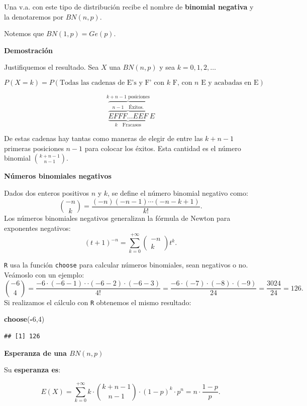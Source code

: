 \documentclass[]{book}
\newenvironment{Shaded}{\begin{snugshade}}{\end{snugshade}}
\newcommand{\DecValTok}[1]{\textcolor[rgb]{0.00,0.00,0.81}{#1}}
\newcommand{\KeywordTok}[1]{\textcolor[rgb]{0.13,0.29,0.53}{\textbf{#1}}}
\newcommand{\NormalTok}[1]{#1}
\newcommand{\OperatorTok}[1]{\textcolor[rgb]{0.81,0.36,0.00}{\textbf{#1}}}
\begin{document}
Una v.a. con este tipo de distribución recibe el nombre de \textbf{binomial negativa} y la denotaremos por \(BN(n,p)\).

Notemos que \(BN(1,p)=Ge(p)\).

\textbf{Demostración}

Justifiquemos el resultado. Sea \(X\) una \(BN(n,p)\) y sea \(k=0,1,2,\ldots\)

\[P(X=k)=P(\mbox{Todas las cadenas de E's y F' con $k$ F, con $n$ E y acabadas en E})\]

\[
\overbrace{\underbrace{\overbrace{EFFF\ldots EEF}^{n-1 \quad \mbox{Éxitos}.}}}_{k \quad\mbox{Fracasos}}^{k+n-1\mbox{ posiciones}}E
\]

De estas cadenas hay tantas como maneras de elegir de entre las \(k+n-1\) primeras posiciones \(n-1\) para colocar los éxitos. Esta cantidad es el número binomial \({k+n-1\choose n-1}\).

\textbf{Números binomiales negativos}

Dados dos enteros positivos \(n\) y \(k\), se define el número binomial negativo como:
\[\binom{-n}{k}=\frac{(-n)(-n-1)\cdots (-n-k+1)}{k!}.\]
Los números binomiales negativos generalizan la fórmula de Newton para exponentes negativos:
\[
(t+1)^{-n}=\sum_{k=0}^{+\infty}\left(\begin{array}{c} -n
\\ k\end{array}\right) t^{k}.
\]

\texttt{R} usa la función \texttt{choose} para calcular números binomiales, sean negativos o no. Veámoslo con un ejemplo:
\[
{-6\choose 4}=\frac{-6\cdot (-6-1)\cdot \cdot (-6-2)\cdot (-6-3) }{4!}= \frac{-6\cdot(-7)\cdot (-8)\cdot (-9)}{24}
= \frac{3024}{24}=126.
\]
Si realizamos el cálculo con \texttt{R} obtenemos el mismo resultado:

\begin{Shaded}
\begin{Highlighting}[]
\KeywordTok{choose}\NormalTok{(}\OperatorTok{-}\DecValTok{6}\NormalTok{,}\DecValTok{4}\NormalTok{)}
\end{Highlighting}
\end{Shaded}

\begin{verbatim}
## [1] 126
\end{verbatim}

\textbf{Esperanza de una \(BN(n,p)\)}

Su \textbf{esperanza es}:

\[E(X)=\sum_{k=0}^{+\infty} k\cdot {k+n-1\choose n-1} \cdot (1-p)^{k}\cdot p^n=n\cdot\frac{1-p}{p}.\]
\end{document}
